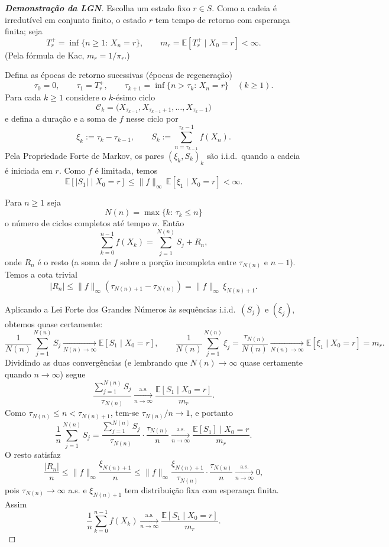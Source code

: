\documentclass[12pt,letterpaper]{article}
\begin{document}
\begin{proof}[\textbf{Demonstração da LGN}]
  Escolha um estado fixo $r\in S$.  Como a cadeia é irredutível em
  conjunto finito, o estado $r$ tem tempo de retorno com esperança
  finita; seja
  \[
    T^+_r=\inf\{n\ge1:\, X_n=r\},\qquad 
    m_r=\mathbb E[T^+_r\mid X_0=r]<\infty.
  \]
  (Pela fórmula de Kac, $m_r=1/\pi_r$.)

  Defina as épocas de retorno sucessivas (épocas de regeneração)
  \[
    \tau_0=0,\qquad 
    \tau_1=T^+_r,\qquad 
    \tau_{k+1}=\inf\{n>\tau_k:\, X_n=r\}\quad(k\ge1).
  \]
  Para cada $k\ge1$ considere o $k$-ésimo ciclo
  \[
    \mathcal C_k = \big(X_{\tau_{k-1}}, X_{\tau_{k-1}+1},\dots,
    X_{\tau_k-1}\big)
  \]
  e defina a duração e a soma de $f$ nesse ciclo por
  \[
    \xi_k:=\tau_k-\tau_{k-1},\qquad S_k:=\sum_{n=\tau_{k-1}}^{\tau_k-1}
    f(X_n).
  \]
  Pela Propriedade Forte de Markov, os pares $(\xi_k,S_k)_k$ são
  i.i.d.~quando a cadeia é iniciada em $r$.  Como $f$ é limitada, temos
  $$
  \mathbb E[|S_1|\mid X_0=r]\le
  \|f\|_\infty\,\mathbb E[\xi_1 \mid X_0=r]<\infty.
  $$

Para $n\ge1$ seja 
\[
N(n)=\max\{k:\,\tau_k\le n\}
\]
o número de ciclos completos até tempo $n$. Então
\[
\sum_{k=0}^{n-1} f(X_k)=\sum_{j=1}^{N(n)} S_j + R_n,
\]
onde $R_n$ é o resto (a soma de $f$ sobre a porção incompleta entre $\tau_{N(n)}$ e $n-1$). 
Temos a cota trivial 
\[
|R_n|\le \|f\|_\infty(\tau_{N(n)+1}-\tau_{N(n)})=\|f\|_\infty\,\xi_{N(n)+1}.
\]

Aplicando a Lei Forte dos Grandes Números às sequências i.i.d.~$(S_j)$
e $(\xi_j)$, obtemos quase certamente:
\[
\frac{1}{N(n)}\sum_{j=1}^{N(n)} S_j 
\xrightarrow[N(n)\to\infty]{} \mathbb E[S_1\mid X_0=r],
\qquad
\frac{1}{N(n)}\sum_{j=1}^{N(n)} \xi_j 
= \frac{\tau_{N(n)}}{N(n)} 
\xrightarrow[N(n)\to\infty]{} \mathbb E[\xi_1\mid X_0=r]=m_r.
\]
Dividindo as duas convergências (e lembrando que $N(n)\to\infty$ quase certamente quando $n\to\infty$) segue
\[
\frac{\sum_{j=1}^{N(n)} S_j}{\tau_{N(n)}} 
\xrightarrow[n\to\infty]{\mathrm{a.s.}} 
\frac{\mathbb E[S_1\mid X_0=r]}{m_r}.
\]
Como $\tau_{N(n)}\le n<\tau_{N(n)+1}$, tem-se $\tau_{N(n)}/n\to1$, e portanto
\[
\frac{1}{n}\sum_{j=1}^{N(n)} S_j 
= \frac{\sum_{j=1}^{N(n)} S_j}{\tau_{N(n)}}\cdot\frac{\tau_{N(n)}}{n} 
\xrightarrow[n\to\infty]{\mathrm{a.s.}} 
\frac{\mathbb E[S_1]\mid X_0=r}{m_r}.
\]
O resto satisfaz
\[
\frac{|R_n|}{n} 
\le \|f\|_\infty\frac{\xi_{N(n)+1}}{n} 
\le \|f\|_\infty\frac{\xi_{N(n)+1}}{\tau_{N(n)}}\cdot\frac{\tau_{N(n)}}{n} 
\xrightarrow[n\to\infty]{\mathrm{a.s.}} 0,
\]
pois $\tau_{N(n)}\to\infty$ a.s. e $\xi_{N(n)+1}$ tem distribuição fixa com esperança finita. Assim
\[
\frac{1}{n}\sum_{k=0}^{n-1} f(X_k) 
\xrightarrow[n\to\infty]{\mathrm{a.s.}} 
\frac{\mathbb E[S_1\mid X_0=r]}{m_r}.
\]


\end{proof}
\end{document}

